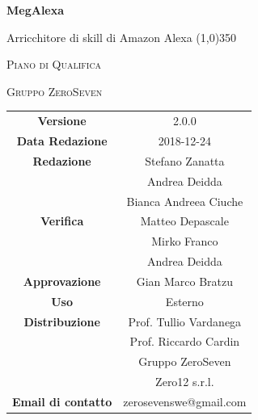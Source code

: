 \documentclass[a4paper,12pt,openany]{book}
\author{Stefano Zanatta}
\date{2018-12-24}
\begin{document}
\begin{titlepage}
	\centering
	{\huge\bfseries MegAlexa\par}
	Arricchitore di skill di Amazon Alexa
	\line(1,0){350} \\
	{\scshape\LARGE Piano di Qualifica \par}
	\vspace{1cm}
	{\scshape Gruppo ZeroSeven \par}
	\logo
	\begin{tabular}{c|c}
		{\hfill \textbf{Versione}} 			& 2.0.0				\\
		{\hfill\textbf{Data Redazione}} 	& 2018-12-24	\\ 
		{\hfill\textbf{Redazione}} 			&  Stefano Zanatta \\&Andrea Deidda\\&Bianca Andreea Ciuche\\
	{\hfill\textbf{Verifica}} 				&  	Matteo Depascale\\ &Mirko Franco\\ &Andrea Deidda\\
		{\hfill\textbf{Approvazione}} 		&  			Gian Marco Bratzu\\ 
	{\hfill\textbf{Uso}} 					& 		Esterno		\\ 
	{\hfill\textbf{Distribuzione}} 			& 			Prof. Tullio Vardanega \\ & Prof. Riccardo Cardin \\ & Gruppo ZeroSeven		\\ & Zero12 s.r.l. \\
		{\hfill\textbf{Email di contatto}} & zerosevenswe@gmail.com \\
	\end{tabular}
\end{titlepage}
	

	
	\label{LastFrontPage}
	\newpage	
	
	\pagestyle{mymain}
	\tableofcontents
	\listoftables
	
	
	

	\begin{appendices}
		
		
		
	\end{appendices}

			
	\label{LastPage}
\end{document}

